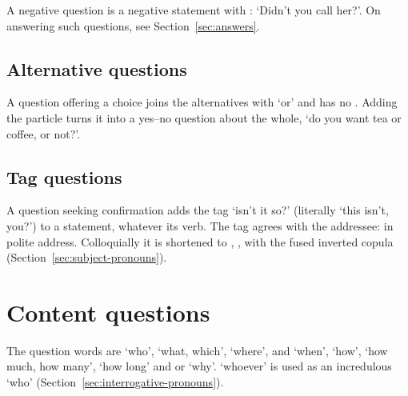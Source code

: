 A negative question is a negative statement with :  `Didn't you call her?'. On answering such questions, see Section~\ref{sec:answers}.

\subsection{Alternative questions}
A question offering a choice joins the alternatives with  `or' and has no . Adding the particle turns it into a yes--no question about the whole, `do you want tea or coffee, or not?'.

\subsection{Tag questions}
A question seeking confirmation adds the tag  `isn't it so?' (literally `this isn't, you?') to a statement, whatever its verb. The tag agrees with the addressee:  in polite address. Colloquially it is shortened to , , with the fused inverted copula (Section~\ref{sec:subject-pronouns}).

\section{Content questions}\label{sec:content-questions}
The question words are  `who',  `what, which',  `where',  and  `when',  `how',  `how much, how many',  `how long' and  or  `why'.  `whoever' is used as an incredulous `who' (Section~\ref{sec:interrogative-pronouns}).

